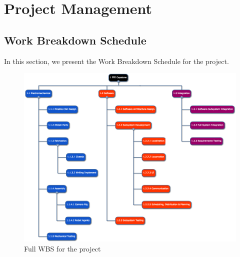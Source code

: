 \section{Project Management}
\label{sec:project_management}

\subsection{Work Breakdown Schedule}
\label{sec:wbs}

In this section, we present the Work Breakdown Schedule for the project.

\begin{figure}[!ht]
\centering
\includegraphics[width=\textwidth]{wbs_schedule/wbs_1_31_17.png}
\caption{Full WBS for the project}
\label{fig:full-wbs}
\end{figure}

